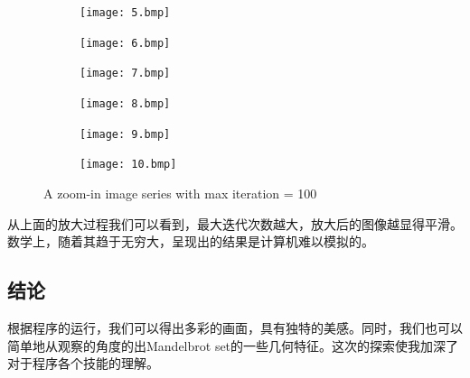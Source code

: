 \documentclass{ctexart}
\begin{document}
\begin{figure}[H]
\begin{subfigure}{0.3\textwidth}
	\centering
	\texttt{[image: 5.bmp]}
\end{subfigure}
\begin{subfigure}{0.3\textwidth}
	\centering
	\texttt{[image: 6.bmp]}
\end{subfigure}
\begin{subfigure}{0.3\textwidth}
	\centering
	\texttt{[image: 7.bmp]}
\end{subfigure}

\begin{subfigure}{0.3\textwidth}
	\centering
	\texttt{[image: 8.bmp]}
\end{subfigure}
\begin{subfigure}{0.3\textwidth}
	\centering
	\texttt{[image: 9.bmp]}
\end{subfigure}
\begin{subfigure}{0.3\textwidth}
	\centering
	\texttt{[image: 10.bmp]}
\end{subfigure}
\caption{A zoom-in image series with max iteration = 100}
\end{figure}
从上面的放大过程我们可以看到，最大迭代次数越大，放大后的图像越显得平滑。数学上，随着其趋于无穷大，呈现出的结果是计算机难以模拟的。
\subsection{结论}
根据程序的运行，我们可以得出多彩的画面，具有独特的美感。同时，我们也可以简单地从观察的角度的出Mandelbrot set的一些几何特征。这次的探索使我加深了对于程序各个技能的理解。

\end{document}
